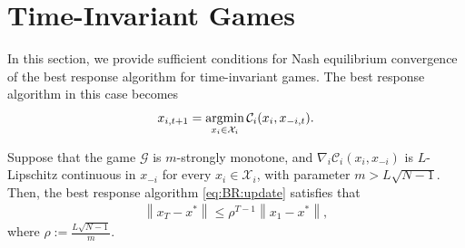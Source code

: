 \section{Time-Invariant Games}\label{sec:BR}
In this section, we provide sufficient conditions for Nash equilibrium convergence of the best response algorithm for time-invariant games. The best response algorithm in this case becomes 
\begin{align}\label{eq:BR:update}
    x_{i,t+1} = \mathop{\rm{arg min}}_{x_i \in \mathcal{X}_i} \mathcal{C}_{i} (x_i, x_{-i,t}).
\end{align} 
%
%
%
\begin{proposition}\label{prop:BR}
Suppose that the game $\mathcal{G}$ is $m$-strongly monotone, and $\nabla_i \mathcal{C}_i(x_i,x_{-i})$ is $L$-Lipschitz continuous in $x_{-i}$ 
for every $x_i \in \mathcal{X}_i$, with parameter $m>L \sqrt{N-1}$. 
Then, the best response algorithm \eqref{eq:BR:update} satisfies that
\begin{align}\label{eq:BR:convergence}
    \left\| x_T - x^{*}\right\| \leq \rho^{T-1} \left\| x_1 - x^{*}\right\|,
\end{align}
where $\rho:= \frac{L\sqrt{N-1}}{m}$.
\end{proposition}
%
